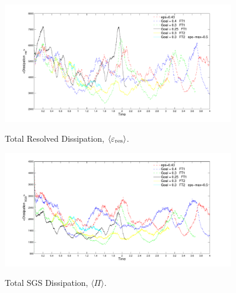 \begin{figure}
  \vspace{-20pt}
\begin{center}
  \includegraphics[width=0.9\textwidth]{figures/Statistics/TotalResolvedDissipation.pdf}\\
\end{center}
  \vspace{-20pt}
  \caption{Total Resolved Dissipation, $\langle \varepsilon_{\rm res} \rangle$.}
  \label{fig:RD}
\end{figure}


\clearpage
\newpage


\begin{figure}[t]
  \vspace{-20pt}
\begin{center}
  \includegraphics[width=0.9\textwidth]{figures/Statistics/TotalSGSDissipation.pdf}\\
\end{center}
  \vspace{-20pt}
  \caption{Total SGS Dissipation,  $\langle \Pi \rangle$.}
  \label{fig:SGSD}
\end{figure}



